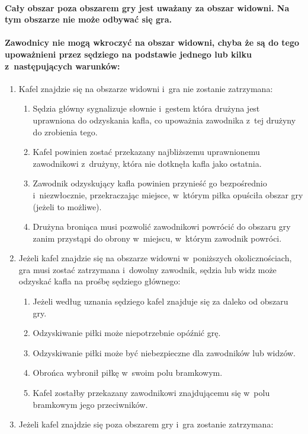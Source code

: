 \documentclass[12pt,a4paper]{article}
\begin{document}
\paragraph{Cały obszar poza obszarem gry jest uważany za obszar
	widowni. Na tym obszarze nie może odbywać się gra.}

\paragraph{Zawodnicy nie mogą wkroczyć na obszar widowni, chyba
	że są do tego upoważnieni przez sędziego na podstawie jednego lub kilku
 z~następujących warunków:}

\begin{enumerate}
	\item
	      Kafel znajdzie się na obszarze widowni i~gra nie zostanie zatrzymana:

	      \begin{enumerate}
		      \item
		            Sędzia główny sygnalizuje słownie i~gestem która drużyna jest
		            uprawniona do odzyskania kafla, co upoważnia zawodnika z~tej drużyny
		            do zrobienia tego.
		      \item
		            Kafel powinien zostać przekazany najbliższemu uprawnionemu
		            zawodnikowi z~drużyny, która nie dotknęła kafla jako ostatnia.
		      \item
		            Zawodnik odzyskujący kafla powinien przynieść go bezpośrednio i~niezwłocznie, przekraczając miejsce, w~którym piłka opuściła obszar
		            gry (jeżeli to możliwe).
		      \item
		            Drużyna broniąca musi pozwolić zawodnikowi powrócić do obszaru gry
		            zanim przystąpi do obrony w~miejscu, w~którym zawodnik powróci.
	      \end{enumerate}
	\item
	      Jeżeli kafel znajdzie się na obszarze widowni w~poniższych
	      okolicznościach, gra musi zostać zatrzymana i~dowolny zawodnik, sędzia
	      lub widz może odzyskać kafla na prośbę sędziego głównego:

	      \begin{enumerate}
		      \item
		            Jeżeli według uznania sędziego kafel znajduje się za daleko od
		            obszaru gry.
		      \item
		            Odzyskiwanie piłki może niepotrzebnie opóźnić grę.
		      \item
		            Odzyskiwanie piłki może być niebezpieczne dla zawodników lub widzów.
		      \item
		            Obrońca wybronił piłkę w~swoim polu bramkowym.
		      \item
		            Kafel zostałby przekazany zawodnikowi znajdującemu się w~polu
		            bramkowym jego przeciwników.
	      \end{enumerate}
	\item
	      Jeżeli kafel znajdzie się poza obszarem gry i~gra zostanie zatrzymana:


\end{enumerate}
\end{document}
